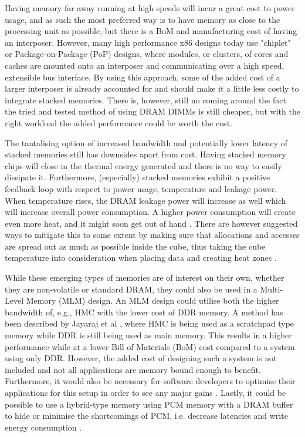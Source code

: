 Having memory far away running at high speeds will incur a great cost to power usage, and as such the most preferred way is to have memory as close to the processing unit as possible, but there is a BoM and manufacturing cost of having an interposer. However, many high performance x86 designs today use "chiplet" or Package-on-Package (PoP) designs, where modules, or clusters, of cores and caches are mounted onto an interposer and communicating over a high speed, extensible bus interface. By using this approach, some of the added cost of a larger interposer is already accounted for and should make it a little less costly to integrate stacked memories. There is, however, still no coming around the fact the tried and tested method of using DRAM DIMMs is still cheaper, but with the right workload the added performance could be worth the cost.
\bigskip

The tantalising option of increased bandwidth and potentially lower latency of stacked memories still has downsides apart from cost. Having stacked memory chips will close in the thermal energy generated and there is no way to easily dissipate it. Furthermore, (especially) stacked memories exhibit a positive feedback loop with respect to power usage, temperature and leakage power. When temperature rises, the DRAM leakage power will increase as well which will increase overall power consumption. A higher power consumption will create even more heat, and it might soon get out of hand \cite{4212027}. There are however suggested ways to mitigate this to some extent by making sure that allocations and accesses are spread out as much as possible inside the cube, thus taking the cube temperature into consideration when placing data and creating heat zones \cite{7252085}.
\bigskip

While these emerging types of memories are of interest on their own, whether they are non-volatile or standard DRAM, they could also be used in a Multi-Level Memory (MLM) design. An MLM design could utilise both the higher bandwidth of, e.g., HMC with the lower cost of DDR memory. A method has been described by Jayaraj et al \cite{Jayaraj:2015:PPM:2818950.2818976}, where HMC is being used as a scratchpad type memory while DDR is still being used as main memory. This results in a higher performance while at a lower Bill of Materials (BoM) cost compared to a system using only DDR. However, the added cost of designing such a system is not included and not all applications are memory bound enough to benefit. Furthermore, it would also be necessary for software developers to optimise their applications for this setup in order to see any major gains \cite{Bender:2015:KCT:2818950.2818977}\cite{BENDER2017213}. Lastly, it could be possible to use a hybrid-type memory using PCM memory with a DRAM buffer to hide or minimise the shortcomings of PCM, i.e. decrease latencies and write energy consumption \cite{Lee:2009:APC:1555815.1555758}.
\bigskip


